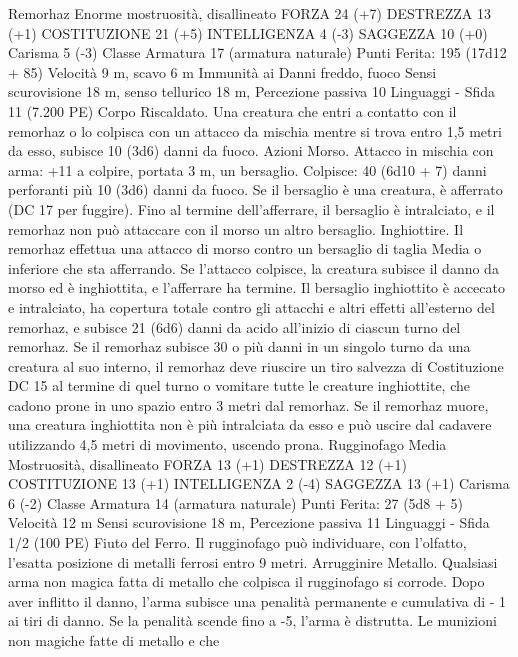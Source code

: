 \begin{multicols}{2}
Remorhaz
Enorme mostruosità, disallineato
FORZA 24 (+7)
DESTREZZA 13 (+1)
COSTITUZIONE 21 (+5)
INTELLIGENZA 4 (-3)
SAGGEZZA 10 (+0)
Carisma 5 (-3)
Classe Armatura 17 (armatura naturale)
\hspace*{0pt}\hfill{Punti Ferita}: 195 (17d12 + 85)
Velocità 9 m, scavo 6 m
Immunità ai Danni freddo, fuoco
Sensi scurovisione 18 m, senso tellurico 18 m, Percezione
passiva 10
Linguaggi -
Sfida 11 (7.200 PE)
Corpo Riscaldato. Una creatura che entri a contatto con il
remorhaz o lo colpisca con un attacco da mischia mentre si trova
entro 1,5 metri da esso, subisce 10 (3d6) danni da fuoco.
Azioni
Morso. Attacco in mischia con arma: +11 a colpire, portata 3 m,
un bersaglio.
Colpisce: 40 (6d10 + 7) danni perforanti più 10 (3d6) danni da
fuoco. Se il bersaglio è una creatura, è afferrato (DC 17 per
fuggire). Fino al termine dell’afferrare, il bersaglio è intralciato,
e il remorhaz non può attaccare con il morso un altro bersaglio.
Inghiottire. Il remorhaz effettua una attacco di morso contro un
bersaglio di taglia Media o inferiore che sta afferrando. Se
l’attacco colpisce, la creatura subisce il danno da morso ed è
inghiottita, e l’afferrare ha termine. Il bersaglio inghiottito è
accecato e intralciato, ha copertura totale contro gli attacchi e
altri effetti all’esterno del remorhaz, e subisce 21 (6d6) danni da
acido all’inizio di ciascun turno del remorhaz.
Se il remorhaz subisce 30 o più danni in un singolo turno da una
creatura al suo interno, il remorhaz deve riuscire un tiro salvezza
di Costituzione DC 15 al termine di quel turno o vomitare tutte le
creature inghiottite, che cadono prone in uno spazio entro 3 metri
dal remorhaz. Se il remorhaz muore, una creatura inghiottita non
è più intralciata da esso e può uscire dal cadavere utilizzando 4,5
metri di movimento, uscendo prona.
Rugginofago
Media Mostruosità, disallineato
FORZA 13 (+1)
DESTREZZA 12 (+1)
COSTITUZIONE 13 (+1)
INTELLIGENZA 2 (-4)
SAGGEZZA 13 (+1)
Carisma 6 (-2)
Classe Armatura 14 (armatura naturale)
\hspace*{0pt}\hfill{Punti Ferita}: 27 (5d8 + 5)
Velocità 12 m
Sensi scurovisione 18 m, Percezione passiva 11
Linguaggi -
Sfida 1/2 (100 PE)
Fiuto del Ferro. Il rugginofago può individuare, con l’olfatto,
l’esatta posizione di metalli ferrosi entro 9 metri.
Arrugginire Metallo. Qualsiasi arma non magica fatta di metallo
che colpisca il rugginofago si corrode. Dopo aver inflitto il
danno, l’arma subisce una penalità permanente e cumulativa di -
1 ai tiri di danno. Se la penalità scende fino a -5, l’arma è
distrutta. Le munizioni non magiche fatte di metallo e che

\end{multicols}
